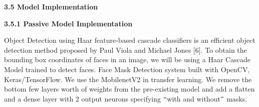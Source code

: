 \documentclass[12pt]{article}
\begin{document}
\vspace{\baselineskip}
\setlength{\parskip}{0.0pt}
\setlength{\parskip}{9.96pt}

\vspace{\baselineskip}
\setlength{\parskip}{0.0pt}
\setlength{\parskip}{9.96pt}

\vspace{\baselineskip}
\setlength{\parskip}{0.0pt}
\setlength{\parskip}{9.96pt}

\vspace{\baselineskip}
\setlength{\parskip}{0.0pt}
\setlength{\parskip}{9.96pt}
\setlength{\parskip}{0.0pt}
\begin{FlushLeft}
\vspace{\baselineskip}
\vspace{\baselineskip}
\vspace{\baselineskip}
\vspace{\baselineskip}
\vspace{\baselineskip}
\vspace{\baselineskip}
\vspace{\baselineskip}
\vspace{\baselineskip}
\vspace{\baselineskip}
\vspace{\baselineskip}
\vspace{\baselineskip}
\vspace{\baselineskip}
\vspace{\baselineskip}
\vspace{\baselineskip}
\vspace{\baselineskip}
\vspace{\baselineskip}

{\fontsize{14pt}{16.8pt}\selectfont \textbf{3.5 Model Implementation}}
\end{FlushLeft}
\setlength{\parskip}{12.0pt}
\begin{justify}
{\fontsize{14pt}{16.8pt}\selectfont \textbf{3.5.1 Passive Model Implementation}}
\end{justify}
\vspace{\baselineskip}
\setlength{\parskip}{0.0pt}
\begin{justify}
Object Detection using Haar feature-based cascade classifiers is an efficient object detection method proposed by Paul Viola and Michael Jones [6]. To obtain the bounding box coordinates of faces in an image, we will be using a Haar Cascade Model trained to detect faces. Face Mask Detection system built with OpenCV, Keras/TensorFlow. We use the MobilenetV2 in transfer learning. We remove the bottom few layers worth of weights from the pre-existing model and add a flatten and a dense layer with 2 output neurons specifying $``$with and without$"$  masks. 
\end{justify}
\end{document}
